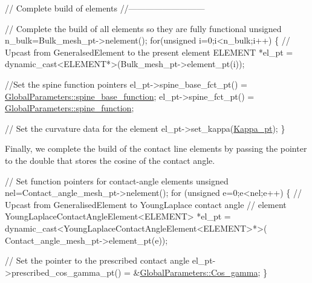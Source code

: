 \begin{DoxyCodeInclude}
 
 \textcolor{comment}{// Complete build of elements}
 \textcolor{comment}{//---------------------------}

 \textcolor{comment}{// Complete the build of all elements so they are fully functional }
 \textcolor{keywordtype}{unsigned} n\_bulk=Bulk\_mesh\_pt->nelement();
 \textcolor{keywordflow}{for}(\textcolor{keywordtype}{unsigned} i=0;i<n\_bulk;i++)
  \{
   \textcolor{comment}{// Upcast from GeneralsedElement to the present element}
   ELEMENT *el\_pt = \textcolor{keyword}{dynamic\_cast<}ELEMENT*\textcolor{keyword}{>}(Bulk\_mesh\_pt->element\_pt(i));

   \textcolor{comment}{//Set the spine function pointers}
   el\_pt->spine\_base\_fct\_pt() = \hyperlink{namespaceGlobalParameters_ac81daf87f8d3f075d9fd108427e70c4f}{GlobalParameters::spine\_base\_function};
   el\_pt->spine\_fct\_pt() =  \hyperlink{namespaceGlobalParameters_a82df8c67f58e78a236fb6a0cc8bf8284}{GlobalParameters::spine\_function};
  
   \textcolor{comment}{// Set the curvature data for the element}
   el\_pt->set\_kappa(\hyperlink{namespaceGlobalParameters_ac6234184cce40ab2c6bec92b37e4ae41}{Kappa\_pt}); 
  \}

\end{DoxyCodeInclude}


Finally, we complete the build of the contact line elements by passing the pointer to the double that stores the cosine of the contact angle.


\begin{DoxyCodeInclude}
 
 \textcolor{comment}{// Set function pointers for contact-angle elements}
 \textcolor{keywordtype}{unsigned} nel=Contact\_angle\_mesh\_pt->nelement();
 \textcolor{keywordflow}{for} (\textcolor{keywordtype}{unsigned} e=0;e<nel;e++)
  \{
   \textcolor{comment}{// Upcast from GeneralisedElement to YoungLaplace contact angle }
   \textcolor{comment}{// element}
   YoungLaplaceContactAngleElement<ELEMENT> *el\_pt = 
    \textcolor{keyword}{dynamic\_cast<}YoungLaplaceContactAngleElement<ELEMENT>*\textcolor{keyword}{>}(
     Contact\_angle\_mesh\_pt->element\_pt(e));
   
   \textcolor{comment}{// Set the pointer to the prescribed contact angle}
   el\_pt->prescribed\_cos\_gamma\_pt() = &\hyperlink{namespaceGlobalParameters_ae982fcb894e82c683d07d3c2fbbead3d}{GlobalParameters::Cos\_gamma};
  \}

\end{DoxyCodeInclude}


